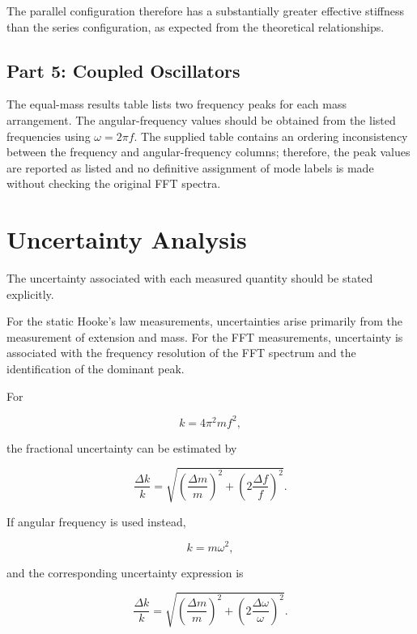 \documentclass[12pt,a4paper]{article}
\begin{document}
The parallel configuration therefore has a substantially greater effective stiffness than the series configuration, as expected from the theoretical relationships.

\subsection{Part 5: Coupled Oscillators}

The equal-mass results table lists two frequency peaks for each mass arrangement. The angular-frequency values should be obtained from the listed frequencies using $\omega=2\pi f$. The supplied table contains an ordering inconsistency between the frequency and angular-frequency columns; therefore, the peak values are reported as listed and no definitive assignment of mode labels is made without checking the original FFT spectra.

\newpage

\section{Uncertainty Analysis}

The uncertainty associated with each measured quantity should be stated explicitly.

For the static Hooke's law measurements, uncertainties arise primarily from the measurement of extension and mass. For the FFT measurements, uncertainty is associated with the frequency resolution of the FFT spectrum and the identification of the dominant peak.

For

\begin{equation}
k=4\pi^2mf^2,
\end{equation}

the fractional uncertainty can be estimated by

\begin{equation}
\frac{\Delta k}{k}
=
\sqrt{
\left(\frac{\Delta m}{m}\right)^2+
\left(2\frac{\Delta f}{f}\right)^2
}.
\label{eq:k_uncertainty}
\end{equation}

If angular frequency is used instead,

\begin{equation}
k=m\omega^2,
\end{equation}

and the corresponding uncertainty expression is

\begin{equation}
\frac{\Delta k}{k}
=
\sqrt{
\left(\frac{\Delta m}{m}\right)^2+
\left(2\frac{\Delta\omega}{\omega}\right)^2
}.
\end{equation}
\end{document}
